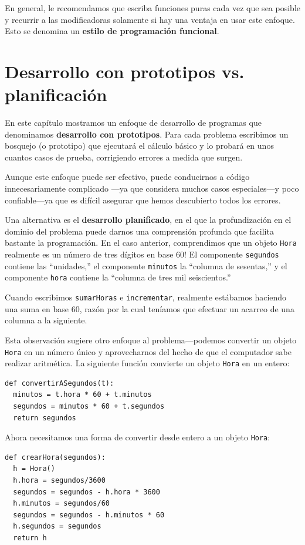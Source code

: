 En general, le recomendamos que escriba funciones puras cada vez que
sea posible y recurrir a las modificadoras solamente si hay una ventaja
en usar este enfoque. Esto se denomina un \textbf{estilo de programación
funcional}.

\section{Desarrollo con prototipos vs. planificación}

\label{convert} 

En este capítulo mostramos un enfoque de desarrollo de programas que
denominamos \textbf{desarrollo con prototipos}. Para cada problema
escribimos un bosquejo (o prototipo) que ejecutará el cálculo básico
y lo probará en unos cuantos casos de prueba, corrigiendo errores
a medida que surgen.

Aunque este enfoque puede ser efectivo, puede conducirnos a código
innecesariamente complicado —ya que considera muchos casos especiales—y
poco confiable—ya que es difícil asegurar que hemos descubierto todos
los errores.

Una alternativa es el \textbf{desarrollo planificado}, en el que la
profundización en el dominio del problema puede darnos una comprensión
profunda que facilita bastante la programación. En el caso anterior,
comprendimos que un objeto \texttt{Hora} realmente es un número de
tres dígitos en base 60! El componente \texttt{segundos} contiene
las ``unidades,'' el componente \texttt{minutos} la ``columna de
sesentas,'' y el componente \texttt{hora} contiene la ``columna
de tres mil seiscientos.''

Cuando escribimos \texttt{sumarHoras} e \texttt{incrementar}, realmente
estábamos haciendo una suma en base 60, razón por la cual teníamos
que efectuar un acarreo de una columna a la siguiente.

Esta observación sugiere otro enfoque al problema—podemos convertir
un objeto \texttt{Hora} en un número único y aprovecharnos del hecho
de que el computador sabe realizar aritmética. La siguiente función
convierte un objeto \texttt{Hora} en un entero:
\begin{verbatim}
def convertirASegundos(t):
  minutos = t.hora * 60 + t.minutos
  segundos = minutos * 60 + t.segundos
  return segundos
\end{verbatim}

Ahora necesitamos una forma de convertir desde entero a un objeto
\texttt{Hora}:
\begin{verbatim}
def crearHora(segundos):
  h = Hora()
  h.hora = segundos/3600
  segundos = segundos - h.hora * 3600
  h.minutos = segundos/60
  segundos = segundos - h.minutos * 60
  h.segundos = segundos
  return h
\end{verbatim}

